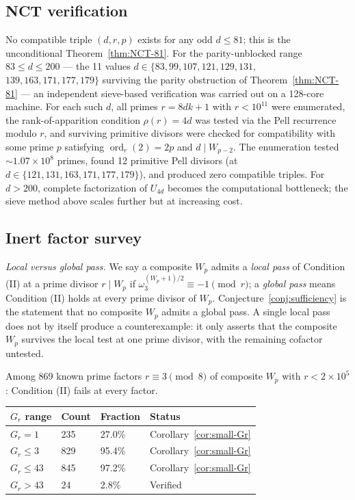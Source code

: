 \documentclass[12pt]{article}
\theoremstyle{plain}
\theoremstyle{definition}
\theoremstyle{remark}
\begin{document}
\subsection{NCT verification}


No compatible triple \((d, r, p)\) exists for any odd
\(d \leq 81\); this is the unconditional Theorem~\ref{thm:NCT-81}. For the
parity-unblocked range \(83 \leq d \leq 200\) --- the 11 values
\(d \in \{83, 99, 107, 121, 129, 131,\)
\(139, 163, 171, 177, 179\}\)
surviving the parity obstruction of Theorem~\ref{thm:NCT-81} --- an independent
sieve-based verification was carried out on a 128-core machine.
For each such \(d\), all primes \(r = 8dk + 1\) with \(r < 10^{11}\)
were enumerated, the rank-of-apparition condition
\(\rho(r) = 4d\) was tested via the Pell recurrence modulo \(r\),
and surviving primitive divisors were checked for compatibility with
some prime \(p\) satisfying \(\operatorname{ord}_r(2) = 2p\) and
\(d \mid W_{p-2}\). The enumeration tested
\(\sim 1.07 \times 10^8\) primes, found 12 primitive Pell divisors
(at \(d \in \{121, 131, 163, 171, 177, 179\}\)), and produced
zero compatible triples. For \(d > 200\), complete factorization of
\(U_{4d}\) becomes the computational bottleneck; the sieve method
above scales further but at increasing cost.

\subsection{Inert factor survey}


\emph{Local versus global pass.} We say a composite \(W_p\)
admits a \emph{local pass} of Condition (II) at a prime divisor
\(r \mid W_p\) if \(\omega_3^{(W_p+1)/2} \equiv -1 \pmod r\); a
\emph{global pass} means Condition (II) holds at every prime
divisor of \(W_p\). Conjecture~\ref{conj:sufficiency} is the statement that no
composite \(W_p\) admits a global pass. A single local pass does
not by itself produce a counterexample: it only asserts that the
composite \(W_p\) survives the local test at one prime divisor,
with the remaining cofactor untested.

Among 869 known prime factors \(r \equiv 3 \pmod{8}\) of composite
\(W_p\) with \(r < 2 \times 10^5\): Condition (II) fails at every
factor.

\begin{center}
\begin{tabular}{llll}
\hline
\(G_r\) range & Count & Fraction & Status \\
\hline
\(G_r = 1\) & 235 & 27.0\% & Corollary~\ref{cor:small-Gr} \\
\(G_r \leq 3\) & 829 & 95.4\% & Corollary~\ref{cor:small-Gr} \\
\(G_r \leq 43\) & 845 & 97.2\% & Corollary~\ref{cor:small-Gr} \\
\(G_r > 43\) & 24 & 2.8\% & Verified \\
\hline
\end{tabular}
\end{center}
\end{document}
